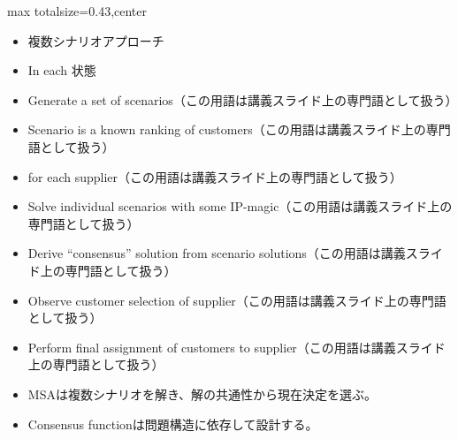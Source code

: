 \clearpage
{}
\begin{minipage}[t]{0.405\textwidth}
\begin{adjustbox}{max totalsize={\textwidth}{0.43\textheight},center}
\begin{minipage}{\textwidth}\scriptsize
{}\begin{itemize}
\item 複数シナリオアプローチ
\item In each 状態
\item Generate a set of scenarios（この用語は講義スライド上の専門語として扱う）
\item Scenario is a known ranking of customers（この用語は講義スライド上の専門語として扱う）
\item for each supplier（この用語は講義スライド上の専門語として扱う）
\item Solve individual scenarios with some IP-magic（この用語は講義スライド上の専門語として扱う）
\item Derive “consensus” solution from scenario solutions（この用語は講義スライド上の専門語として扱う）
\item Observe customer selection of supplier（この用語は講義スライド上の専門語として扱う）
\item Perform final assignment of customers to supplier（この用語は講義スライド上の専門語として扱う）
\end{itemize}\begin{itemize}
\item MSAは複数シナリオを解き、解の共通性から現在決定を選ぶ。
\item Consensus functionは問題構造に依存して設計する。
\end{itemize}
\end{minipage}
\end{adjustbox}
\end{minipage}\hfill
